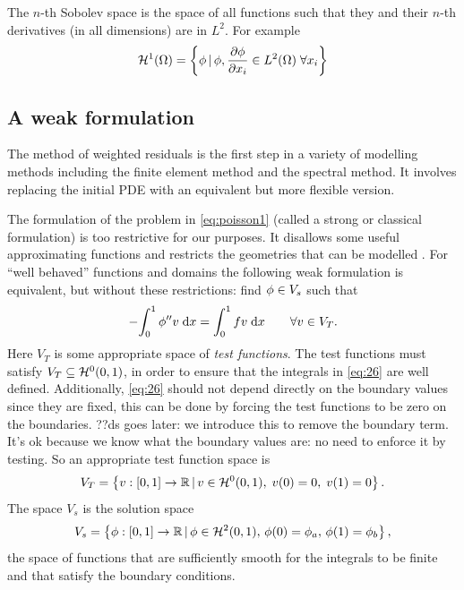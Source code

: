 The $n$-th Sobolev space is the space of all functions such that they and their $n$-th derivatives (in all dimensions) are in $L^2$. For example
\begin{equation}
  \label{eq:H1}
  \mathcal{H}^1(\Omega) = \left\{ { \phi \,|\, \phi, \frac{\partial \phi}{\partial x_i} \in L^2(\Omega) \; \forall x_i } \right\}
\end{equation}


\subsection{A weak formulation}
\label{Derivation-of-weighted-residuals}

The method of weighted residuals is the first step in a variety of modelling methods including the finite element method and the spectral method.
It involves replacing the initial PDE with an equivalent but more flexible version.

The formulation of the problem in \cref{eq:poisson1} (called a strong or classical formulation) is too restrictive for our purposes.
It disallows some useful approximating functions and restricts the geometries that can be modelled \cite[14]{HowardElmanDavidSilvester2006}.
For ``well behaved'' functions and domains the following weak formulation is equivalent, but without these restrictions: find $\phi\in V_{s}$ such that
\begin{equation}
  -{\int_0^1 \phi'' v {\; \mathrm{{d}}}{x}} = {\int_0^1 f v {\; \mathrm{{d}}}{x}} \qquad \forall v \in V_{T}.
  \label{eq:26}
\end{equation}
Here $V_{T}$ is some appropriate space of \emph{test functions}.
The test functions must satisfy $V_{T}\subseteq \mathcal{H}^0(0,1)$, in order to ensure that the integrals in \cref{eq:26} are well defined. 
Additionally, \cref{eq:26} should not depend directly on the boundary values since they are fixed, this can be done by forcing the test functions to be zero on the boundaries. ??ds goes later: we introduce this to remove the boundary term. It's ok because we know what the boundary values are: no need to enforce it by testing.
So an appropriate test function space is
\begin{equation}
  \label{eq:28}
  V_{T}=\left\{ {v : [0,1] \rightarrow \mathbb{R} \,|\, v \in \mathcal{H}^0(0,1),\; v(0) =0,\; v(1)=0} \right\}.
\end{equation}
The space $V_{s}$ is the solution space
\begin{equation}
  V_{s}=\left\{ { \phi : [0,1] \rightarrow \mathbb{R} \,|\, \phi \in \mathcal{H}^2(0,1),\, \phi(0) = \phi_{a},\, \phi(1) = \phi_{b}} \right\},
\end{equation}
\ie the space of functions that are sufficiently smooth for the integrals to be finite and that satisfy the boundary conditions.

